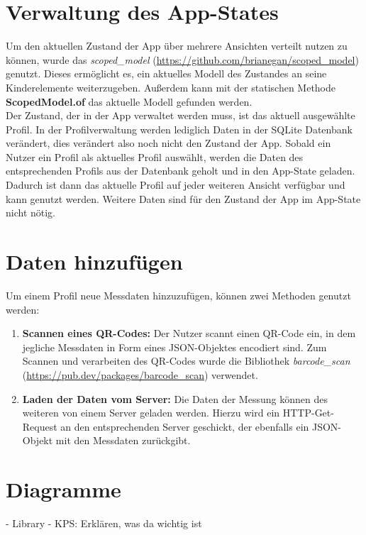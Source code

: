 	\section{Verwaltung des App-States}
	\label{sec:verwaltungAppState}
	
	Um den aktuellen Zustand der App über mehrere Ansichten verteilt nutzen zu können, wurde das \textit{scoped\_model} (\url{https://github.com/brianegan/scoped_model}) genutzt. Dieses ermöglicht es, ein aktuelles Modell des Zustandes an seine Kinderelemente weiterzugeben. Außerdem kann mit der statischen Methode \textbf{ScopedModel.of} das aktuelle Modell gefunden werden.
	\\
	Der Zustand, der in der App verwaltet werden muss, ist das aktuell ausgewählte Profil. In der Profilverwaltung werden lediglich Daten in der SQLite Datenbank verändert, dies verändert also noch nicht den Zustand der App. Sobald ein Nutzer ein Profil als aktuelles Profil auswählt, werden die Daten des entsprechenden Profils aus der Datenbank geholt und in den App-State geladen. Dadurch ist dann das aktuelle Profil auf jeder weiteren Ansicht verfügbar und kann genutzt werden. Weitere Daten sind für den Zustand der App im App-State nicht nötig.
	
	\section{Daten hinzufügen}
	\label{sec:addData}
	
	Um einem Profil neue Messdaten hinzuzufügen, können zwei Methoden genutzt werden:
	
	\begin{enumerate}
		\item \textbf{Scannen eines QR-Codes:} Der Nutzer scannt einen QR-Code ein, in dem jegliche Messdaten in Form eines JSON-Objektes encodiert sind. Zum Scannen und verarbeiten des QR-Codes wurde die Bibliothek \textit{barcode\_scan} (\url{https://pub.dev/packages/barcode_scan}) verwendet.
		\item \textbf{Laden der Daten vom Server:} Die Daten der Messung können des weiteren von einem Server geladen werden. Hierzu wird ein HTTP-Get-Request an den entsprechenden Server geschickt, der ebenfalls ein JSON-Objekt mit den Messdaten zurückgibt.
	\end{enumerate}	
	
	\section{Diagramme}
	\label{sec:charts}
	
	- Library
	- KPS: Erklären, was da wichtig ist
